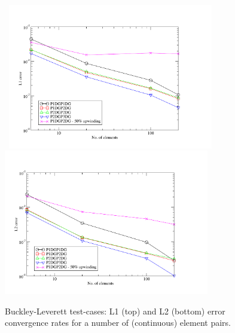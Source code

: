 \begin{figure}[h]
\vbox{\hbox{\hspace{1.cm}
    \includegraphics[width=0.8\textwidth]{./diagrams/L1_convergence_rate}}
\vspace{.0cm}\hbox{\hspace{1.cm}
    \includegraphics[width=0.8\textwidth]{./diagrams/L2_convergence_rate}}}
    \caption{Buckley-Leverett test-cases: L1 (top) and L2 (bottom) error convergence rates for a number of (continuous) element pairs. \label{fig:BL_converg-rates}}
\end{figure}



